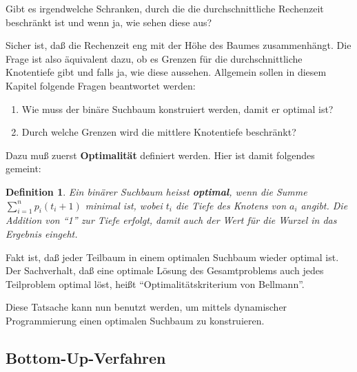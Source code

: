 \documentclass[ngerman,draft,parskip=half*,twoside]{scrreprt}
\theoremstyle{break}
\newtheorem{definition}{Definition}[chapter]
\theoremstyle{nonumberbreak}
\begin{document}
Gibt es irgendwelche Schranken, durch die die durchschnittliche
Rechenzeit beschränkt ist und wenn ja, wie sehen diese aus? 

Sicher ist, daß die Rechenzeit eng mit der Höhe des
Baumes zusammenhängt. Die Frage ist also äquivalent dazu, ob es Grenzen für die durchschnittliche Knotentiefe gibt und falls ja, wie 
diese aussehen.
Allgemein sollen in diesem Kapitel folgende Fragen beantwortet werden:
\begin{enumerate}
    \item Wie muss der binäre Suchbaum konstruiert werden, damit er optimal ist?
    \item Durch welche Grenzen wird die mittlere Knotentiefe beschränkt?
\end{enumerate}

Dazu muß zuerst \textbf{Optimalität} definiert werden. Hier ist damit folgendes gemeint:
 \begin{definition}
   Ein binärer Suchbaum heisst \textbf{optimal}, wenn die Summe $\sum_{i=1}^n p_i(t_i+1)$ minimal ist, wobei
      $t_i$ die Tiefe des Knotens von $a_i$ angibt. Die Addition von "`1"' zur Tiefe erfolgt, damit auch der Wert für die Wurzel in
      das Ergebnis eingeht.
    \end{definition}
Fakt ist, daß jeder Teilbaum in einem optimalen Suchbaum wieder optimal ist. Der Sachverhalt, daß eine optimale Lösung des
Gesamtproblems auch jedes Teilproblem optimal löst, heißt "`Optimalitätskriterium von Bellmann"'.

Diese Tatsache kann nun benutzt werden, um mittels dynamischer Programmierung einen optimalen Suchbaum zu konstruieren.

\subsection{Bottom-Up-Verfahren}
\end{document}
